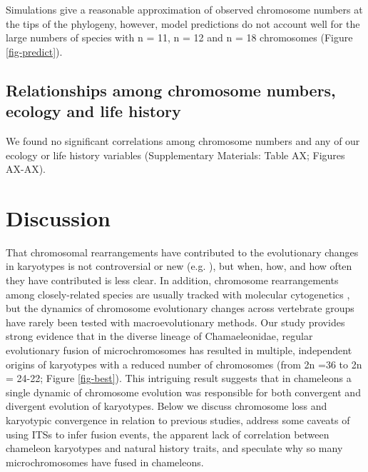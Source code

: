 \documentclass[a4paper, 12pt]{article}
\begin{document}
Simulations give a reasonable approximation of observed chromosome numbers at the tips of the phylogeny, however, model predictions do not account well for the large numbers of species with n = 11, n = 12 and n = 18 chromosomes (Figure \ref{fig-predict}).

\subsection{Relationships among chromosome numbers, ecology and life history}
We found no significant correlations among chromosome numbers and any of our ecology or life history variables (Supplementary Materials: Table AX; Figures AX-AX). 

\section{Discussion}

That chromosomal rearrangements have contributed to the evolutionary changes in karyotypes is not controversial or new (e.g. \citealt{deakin2016anchoring}), but when, how, and how often they have contributed is less clear. 
In addition, chromosome rearrangements among closely-related species are usually tracked with molecular cytogenetics \citep{lisachov2021whole}, but the dynamics of chromosome evolutionary changes across vertebrate groups have rarely been tested with macroevolutionary methods. 
Our study provides strong evidence that in the diverse lineage of Chamaeleonidae, regular evolutionary fusion of microchromosomes has resulted in multiple, independent origins of karyotypes with a reduced number of chromosomes (from 2n =36 to 2n = 24-22; Figure \ref{fig-best}). 
This intriguing result suggests that in chameleons a single dynamic of chromosome evolution was responsible for both convergent and divergent evolution of karyotypes. 
Below we discuss chromosome loss and karyotypic convergence in relation to previous studies, address some caveats of using ITSs to infer fusion events, the apparent lack of correlation between chameleon karyotypes and natural history traits, and speculate why so many microchromosomes have fused in chameleons.    
\end{document}
